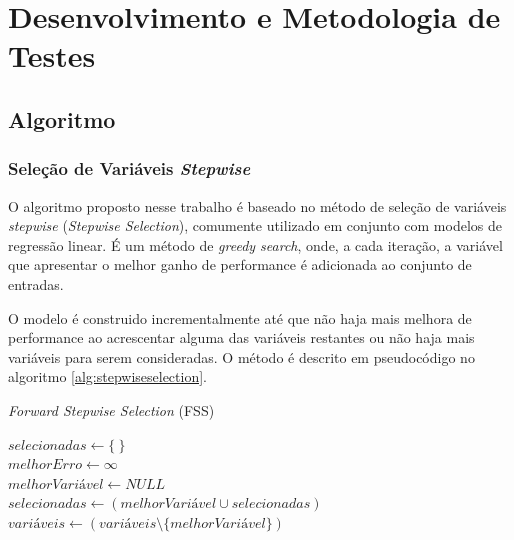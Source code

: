 \chapter[Desenvolvimento e Metodologia]{Desenvolvimento e Metodologia de Testes}

\section{Algoritmo}

\subsection{Seleção de Variáveis \textit{Stepwise}}

O algoritmo proposto nesse trabalho é baseado no método de seleção de variáveis \textit{stepwise} 
(\textit{Stepwise Selection}), comumente utilizado em conjunto com modelos de regressão linear. É um método de \textit{greedy search}, onde, a cada iteração, a variável que apresentar o melhor ganho de performance é adicionada ao conjunto de entradas. 

O modelo é construido incrementalmente até que não haja mais melhora de performance ao acrescentar alguma das variáveis restantes ou não haja mais variáveis para serem consideradas. O método é descrito em pseudocódigo no algoritmo \ref{alg:stepwiseselection}.

\qquad

\begin{algorithm}[H]
    \caption{\textit{Forward Stepwise Selection} (FSS)}
    $selecionadas \gets \{\ \}$ \\
    $melhorErro \gets \infty$ \\
    {   
        $melhorVariável \gets NULL$ \\     
        $selecionadas \gets (melhorVariável \cup selecionadas)$ \\
        $variáveis \gets (variáveis \setminus \{melhorVariável\})$ \\
    }
    \label{alg:stepwiseselection}
\end{algorithm}

